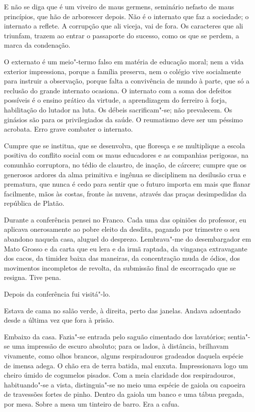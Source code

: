 E não se diga que é um
viveiro de maus germens, seminário nefasto de maus princípios, que hão
de arborescer depois. Não é o internato que faz a sociedade; o
internato a reflete. A corrupção que ali
viceja, vai de fora. Os caracteres que ali triunfam, trazem ao entrar o
passaporte do sucesso, como os que se perdem, a marca da condenação. 

O externato é um meio"-termo falso em matéria de educação moral; nem a
vida exterior impressiona, porque a família preserva, nem o colégio
vive socialmente para instruir a observação, porque falta a convivência
de mundo à parte, que só a reclusão do grande internato ocasiona. O
internato com a soma dos defeitos possíveis é o ensino prático da
virtude, a aprendizagem do ferreiro à forja, habilitação do lutador na
luta. Os débeis sacrificam"-se; não prevalecem. Os ginásios são para
os privilegiados da saúde. O reumatismo deve ser um péssimo acrobata.
Erro grave combater o internato. 

Cumpre que se institua, que se
desenvolva, que floresça e se multiplique a escola positiva do conflito
social com os maus educadores e as companhias perigosas, na comunhão
corruptora, no tédio de claustro, de inação, de cárcere; cumpre que os
generosos ardores da alma primitiva e ingênua se disciplinem na
desilusão crua e prematura, que nunca é cedo para sentir que o futuro
importa em mais que flanar facilmente, mãos às costas, fronte às
nuvens, através das praças desimpedidas da república de Platão. 

Durante a conferência pensei no Franco. Cada uma das opiniões do professor, eu
aplicava onerosamente ao pobre eleito da desdita, pagando por trimestre
o seu abandono naquela casa, aluguel do desprezo. Lembrava"-me do
desembargador em Mato Grosso e da carta que eu lera e da irmã raptada,
da vingança extravagante dos cacos, da timidez baixa das maneiras, da
concentração muda de ódios, dos movimentos incompletos de revolta, da
submissão final de escorraçado que se resigna. Tive pena. 

Depois da conferência fui visitá"-lo. 

Estava de cama no salão verde, à direita,
perto das janelas. Andava adoentado desde a última vez que fora à
prisão. 

Embaixo da casa. Fazia"-se entrada pelo saguão cimentado dos
lavatórios; sentia"-se uma impressão de escuro absoluto; para os
lados, à distância, brilhavam vivamente, como olhos brancos, alguns
respiradouros gradeados daquela espécie de imensa adega. O chão era de
terra batida, mal enxuta. Impressionava logo um cheiro úmido de
cogumelos pisados. Com a meia claridade dos respiradouros,
habituando"-se a vista, distinguia"-se no meio uma espécie de gaiola
ou capoeira de travessões fortes de pinho. Dentro da gaiola um banco e
uma tábua pregada, por mesa. Sobre a mesa um tinteiro de barro. Era a
cafua. 

